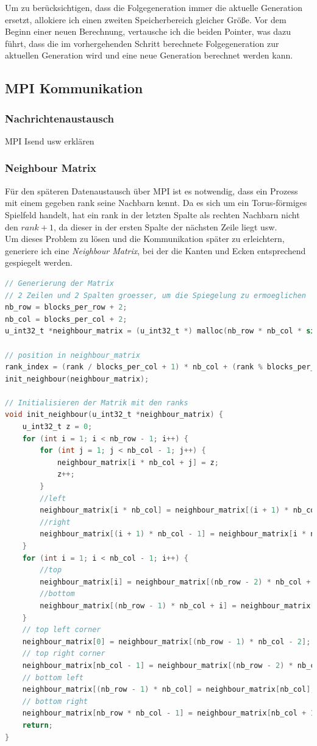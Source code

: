 \documentclass[german,plainarticle,hyperref,utf8]{zihpub}
\begin{document}
	Um zu berücksichtigen, dass die Folgegeneration immer die aktuelle Generation ersetzt, allokiere ich einen zweiten Speicherbereich gleicher Größe. Vor dem Beginn einer neuen Berechnung, vertausche ich die beiden Pointer, was dazu führt, dass die im vorhergehenden Schritt berechnete Folgegeneration zur aktuellen Generation wird und eine neue Generation berechnet werden kann.
	
	\subsection{MPI Kommunikation}
	\subsubsection{Nachrichtenaustausch}
	MPI Isend usw erklären
	\subsubsection{Neighbour Matrix}
	
	Für den späteren Datenaustausch über MPI ist es notwendig, dass ein Prozess mit einem gegeben rank seine Nachbarn kennt. Da es sich um ein Torus-förmiges Spielfeld handelt, hat ein rank in der letzten Spalte als rechten Nachbarn nicht den $rank + 1$, da dieser in der ersten Spalte der nächsten Zeile liegt usw.\\
	Um dieses Problem zu lösen und die Kommunikation später zu erleichtern, generiere ich eine \textit{Neighbour Matrix}, bei der die Kanten und Ecken entsprechend gespiegelt werden.
	\begin{lstlisting}[language=C, caption=Generierung der Neighbour Matrix]
// Generierung der Matrix
// 2 Zeilen und 2 Spalten groesser, um die Spiegelung zu ermoeglichen
nb_row = blocks_per_row + 2;
nb_col = blocks_per_col + 2;
u_int32_t *neighbour_matrix = (u_int32_t *) malloc(nb_row * nb_col * sizeof(u_int32_t));

// position in neighbour_matrix
rank_index = (rank / blocks_per_col + 1) * nb_col + (rank % blocks_per_col + 1);
init_neighbour(neighbour_matrix);

// Initialisieren der Matrik mit den ranks
void init_neighbour(u_int32_t *neighbour_matrix) {
	u_int32_t z = 0;
	for (int i = 1; i < nb_row - 1; i++) {
		for (int j = 1; j < nb_col - 1; j++) {
			neighbour_matrix[i * nb_col + j] = z;
			z++;
		}
		//left
		neighbour_matrix[i * nb_col] = neighbour_matrix[(i + 1) * nb_col - 2];
		//right
		neighbour_matrix[(i + 1) * nb_col - 1] = neighbour_matrix[i * nb_col + 1];
	}
	for (int i = 1; i < nb_col - 1; i++) {
		//top
		neighbour_matrix[i] = neighbour_matrix[(nb_row - 2) * nb_col + i];
		//bottom
		neighbour_matrix[(nb_row - 1) * nb_col + i] = neighbour_matrix[nb_col + i];
	}
	// top left corner
	neighbour_matrix[0] = neighbour_matrix[(nb_row - 1) * nb_col - 2];
	// top right corner
	neighbour_matrix[nb_col - 1] = neighbour_matrix[(nb_row - 2) * nb_col + 1];
	// bottom left
	neighbour_matrix[(nb_row - 1) * nb_col] = neighbour_matrix[nb_col];
	// bottom right
	neighbour_matrix[nb_row * nb_col - 1] = neighbour_matrix[nb_col + 1];
	return;
}\end{lstlisting}
\end{document}

